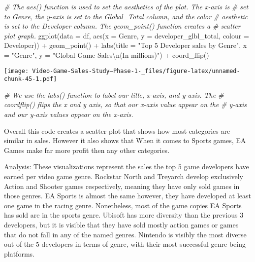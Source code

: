\documentclass[
]{article}
\newenvironment{Shaded}{\begin{snugshade}}{\end{snugshade}}
\newcommand{\AttributeTok}[1]{\textcolor[rgb]{0.77,0.63,0.00}{#1}}
\newcommand{\CommentTok}[1]{\textcolor[rgb]{0.56,0.35,0.01}{\textit{#1}}}
\newcommand{\FunctionTok}[1]{\textcolor[rgb]{0.00,0.00,0.00}{#1}}
\newcommand{\NormalTok}[1]{#1}
\newcommand{\SpecialCharTok}[1]{\textcolor[rgb]{0.00,0.00,0.00}{#1}}
\newcommand{\StringTok}[1]{\textcolor[rgb]{0.31,0.60,0.02}{#1}}
\begin{document}
\begin{Shaded}
\begin{Highlighting}[]
\CommentTok{\# The aes() function is used to set the aesthetics of the plot. The x{-}axis is}
\CommentTok{\# set to Genre, the y{-}axis is set to the Global\_Total column, and the color}
\CommentTok{\# aesthetic is set to the Developer column. The geom\_point() function creates a}
\CommentTok{\# scatter plot graph.}
\FunctionTok{ggplot}\NormalTok{(}\AttributeTok{data =}\NormalTok{ df, }\FunctionTok{aes}\NormalTok{(}\AttributeTok{x =}\NormalTok{ Genre, }\AttributeTok{y =}\NormalTok{ developer\_glbl\_total, }\AttributeTok{colour =}\NormalTok{ Developer)) }\SpecialCharTok{+}
    \FunctionTok{geom\_point}\NormalTok{() }\SpecialCharTok{+} \FunctionTok{labs}\NormalTok{(}\AttributeTok{title =} \StringTok{"Top 5 Developer sales by Genre"}\NormalTok{, }\AttributeTok{x =} \StringTok{"Genre"}\NormalTok{, }\AttributeTok{y =} \StringTok{"Global Game Sales}\SpecialCharTok{\textbackslash{}n}\StringTok{(In millions)"}\NormalTok{) }\SpecialCharTok{+}
    \FunctionTok{coord\_flip}\NormalTok{()}
\end{Highlighting}
\end{Shaded}

\texttt{[image: Video-Game-Sales-Study--Phase-1-\_files/figure-latex/unnamed-chunk-45-1.pdf]}

\begin{Shaded}
\begin{Highlighting}[]
\CommentTok{\# We use the labs() function to label our title, x{-}axis, and y{-}axis. The}
\CommentTok{\# coordflip() flips the x and y axis, so that our x{-}axis value appear on the}
\CommentTok{\# y{-}axis and our y{-}axis values appear on the x{-}axis.}
\end{Highlighting}
\end{Shaded}

Overall this code creates a scatter plot that shows how most categories
are similar in sales. However it also shows that When it comes to Sports
games, EA Games make far more profit then any other categories.

Analysis: These visualizations represent the sales the top 5 game
developers have earned per video game genre. Rockstar North and Treyarch
develop exclusively Action and Shooter games respectively, meaning they
have only sold games in those genres. EA Sports is almost the same
however, they have developed at least one game in the racing genre.
Nonetheless, most of the game copies EA Sports has sold are in the
sports genre. Ubisoft has more diversity than the previous 3 developers,
but it is visible that they have sold mostly action games or games that
do not fall in any of the named genres. Nintendo is visibly the most
diverse out of the 5 developers in terms of genre, with their most
successful genre being platforms.
\end{document}
